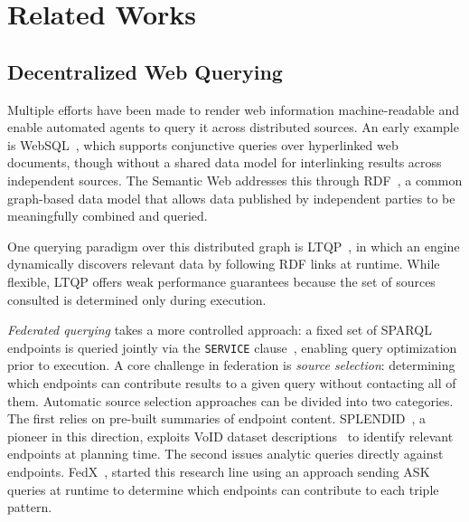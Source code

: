 \section{Related Works}\label{sec:related}

\subsection{Decentralized Web Querying}

Multiple efforts have been made to render web information machine-readable and enable automated agents to query it across distributed sources.
An early example is WebSQL~\cite{Mendelzon1996}, which supports conjunctive queries over hyperlinked web documents, though without a shared data model for interlinking results across independent sources.
The Semantic Web addresses this through RDF~\cite{w3ConceptsAbstract}, a common graph-based data model that allows data published by independent parties to be meaningfully combined and queried.

One querying paradigm over this distributed graph is \ac{LTQP}~\cite{hartig2012foundations}, in which an engine dynamically discovers relevant data by following RDF links at runtime.
While flexible, LTQP offers weak performance guarantees because the set of sources consulted is determined only during execution.

\emph{Federated querying} takes a more controlled approach: a fixed set of SPARQL endpoints is queried jointly via the \texttt{SERVICE} clause~\cite{w3SPARQLFederated,BuilAranda2013}, enabling query optimization prior to execution.
A core challenge in federation is \emph{source selection}: determining which endpoints can contribute results to a given query without contacting all of them.
Automatic source selection approaches can be divided into two categories.
The first relies on pre-built summaries of endpoint content.
SPLENDID~\cite{gorlitz2011splendid}, a pioneer in this direction, exploits VoID dataset descriptions~\cite{w3DescribingLinked} to identify relevant endpoints at planning time.
The second issues analytic queries directly against endpoints.
FedX~\cite{schwarte2011fedx}, started this research line using an approach sending ASK queries at runtime to determine which endpoints can contribute to each triple pattern.

